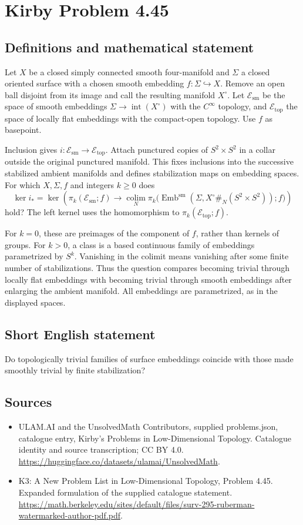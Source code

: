 \documentclass[11pt,a4paper]{article}
\begin{document}
\section*{Kirby Problem 4.45}\label{statement}

\subsection{Definitions and mathematical statement}
Let $X$ be a closed simply connected smooth four-manifold and $\Sigma$ a closed oriented surface with a chosen smooth embedding $f:\Sigma\hookrightarrow X$. Remove an open ball disjoint from its image and call the resulting manifold $X^\circ$. Let $\mathcal E_{\mathrm{sm}}$ be the space of smooth embeddings $\Sigma\to\operatorname{int}(X^\circ)$ with the $C^\infty$ topology, and $\mathcal E_{\mathrm{top}}$ the space of locally flat embeddings with the compact-open topology. Use $f$ as basepoint.

Inclusion gives $i:\mathcal E_{\mathrm{sm}}\to\mathcal E_{\mathrm{top}}$. Attach punctured copies of $S^2\times S^2$ in a collar outside the original punctured manifold. This fixes inclusions into the successive stabilized ambient manifolds and defines stabilization maps on embedding spaces. For which $X,\Sigma,f$ and integers $k\ge0$ does
\[
\ker i_* = \ker\left(
\pi_k(\mathcal E_{\mathrm{sm}};f)\longrightarrow
\operatorname*{colim}_{N}\pi_k\bigl(
\operatorname{Emb}^{\mathrm{sm}}(\Sigma,X^\circ\#_N(S^2\times S^2));f\bigr)\right)
\]
hold? The left kernel uses the homomorphism to $\pi_k(\mathcal E_{\mathrm{top}};f)$.

For $k=0$, these are preimages of the component of $f$, rather than kernels of groups. For $k>0$, a class is a based continuous family of embeddings parametrized by $S^k$. Vanishing in the colimit means vanishing after some finite number of stabilizations. Thus the question compares becoming trivial through locally flat embeddings with becoming trivial through smooth embeddings after enlarging the ambient manifold. All embeddings are parametrized, as in the displayed spaces.
\subsection{Short English statement}
Do topologically trivial families of surface embeddings coincide with those made smoothly trivial by finite stabilization?
\subsection{Sources}
\begin{itemize}
\item[S1] ULAM.AI and the UnsolvedMath Contributors, supplied problems.json, catalogue entry, Kirby's Problems in Low-Dimensional Topology. Catalogue identity and source transcription; CC BY 4.0.
\url{https://huggingface.co/datasets/ulamai/UnsolvedMath}.
\item[S2] K3: A New Problem List in Low-Dimensional Topology, Problem 4.45. Expanded formulation of the supplied catalogue statement.
\url{https://math.berkeley.edu/sites/default/files/surv-295-ruberman-watermarked-author-pdf.pdf}.
\end{itemize}
\end{document}

